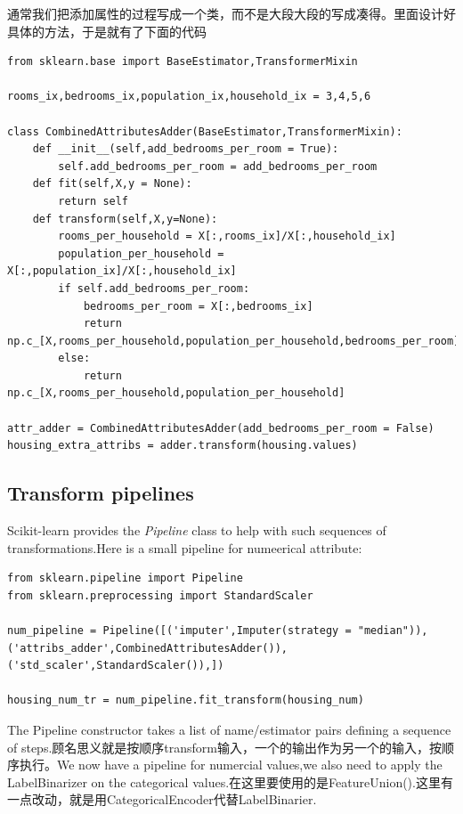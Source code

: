 \documentclass[UTF8]{ctexart}
\begin{document}
通常我们把添加属性的过程写成一个类，而不是大段大段的写成凑得。里面设计好具体的方法，于是就有了下面的代码
\begin{lstlisting}
from sklearn.base import BaseEstimator,TransformerMixin

rooms_ix,bedrooms_ix,population_ix,household_ix = 3,4,5,6

class CombinedAttributesAdder(BaseEstimator,TransformerMixin):
    def __init__(self,add_bedrooms_per_room = True):
        self.add_bedrooms_per_room = add_bedrooms_per_room
    def fit(self,X,y = None):
        return self
    def transform(self,X,y=None):
        rooms_per_household = X[:,rooms_ix]/X[:,household_ix]
        population_per_household = X[:,population_ix]/X[:,household_ix]
        if self.add_bedrooms_per_room:
            bedrooms_per_room = X[:,bedrooms_ix]
            return np.c_[X,rooms_per_household,population_per_household,bedrooms_per_room]
        else:
            return np.c_[X,rooms_per_household,population_per_household]

attr_adder = CombinedAttributesAdder(add_bedrooms_per_room = False)
housing_extra_attribs = adder.transform(housing.values)
\end{lstlisting}

\subsection{Transform pipelines}

Scikit-learn provides the \emph{Pipeline} class to help with such sequences of transformations.Here is a small pipeline for numeerical attribute:
\begin{lstlisting}
from sklearn.pipeline import Pipeline
from sklearn.preprocessing import StandardScaler

num_pipeline = Pipeline([('imputer',Imputer(strategy = "median")),('attribs_adder',CombinedAttributesAdder()),('std_scaler',StandardScaler()),])

housing_num_tr = num_pipeline.fit_transform(housing_num)
\end{lstlisting}

The Pipeline constructor takes a list of name/estimator pairs defining a sequence of steps.顾名思义就是按顺序transform输入，一个的输出作为另一个的输入，按顺序执行。We now have a pipeline for numercial values,we also need to apply the LabelBinarizer on the categorical values.在这里要使用的是FeatureUnion().这里有一点改动，就是用CategoricalEncoder代替LabelBinarier.
\end{document}
